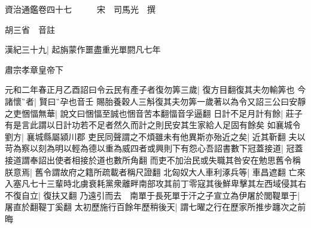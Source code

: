 資治通鑑卷四十七　　　宋　司馬光　撰

胡三省　音註

漢紀三十九|{
	起旃蒙作噩盡重光單閼凡七年}


肅宗孝章皇帝下

元和二年春正月乙酉詔曰令云民有產子者復勿筭三歲|{
	復方目翻復其夫勿輸筭也}
今諸懷者|{
	賢曰孕也音壬}
賜胎養穀人三斛復其夫勿筭一歲著以為令又詔三公曰安靜之吏悃愊無華|{
	說文曰悃愊至誠也悃音苦本翻愊音孚逼翻}
日計不足月計有餘|{
	莊子有是言此謂以日計功若不足者然久而計之則民安其生家給人足固有餘矣}
如襄城令劉方|{
	襄城縣屬潁川郡}
吏民同聲謂之不煩雖未有他異斯亦殆近之矣|{
	近其靳翻}
夫以苛為察以刻為明以輕為德以重為威四者或興則下有怨心吾詔書數下冠蓋接道|{
	冠蓋接道謂奉詔出使者相接於道也數所角翻}
而吏不加治民或失職其咎安在勉思舊令稱朕意焉|{
	舊令謂故府之籍所疏載者稱尺證翻}
北匈奴大人車利涿兵等|{
	車昌遮翻}
亡來入塞凡七十三輩時北虜衰耗黨衆離畔南部攻其前丁零寇其後鮮卑擊其左西域侵其右不復自立|{
	復扶又翻}
乃遠引而去　南單于長死單于汗之子宣立為伊屠於閭鞮單于|{
	屠直於翻鞮丁奚翻}
太初歷施行百餘年歷稍後天|{
	謂七曜之行在歷家所推步躔次之前晦}


